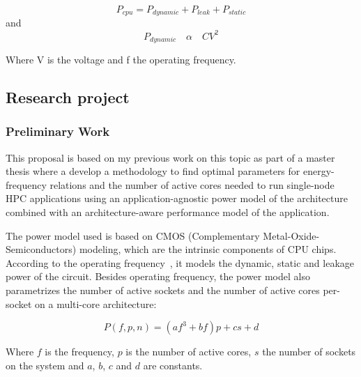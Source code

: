 \begin{equation}
    P_{cpu}=P_{dynamic}+P_{leak}+P_{static}
\end{equation}
and
\begin{equation}
    P_{dynamic} \quad \alpha \quad CV^2
\end{equation}

Where V is the voltage and f the operating frequency.

\subsection{Research project}

\subsubsection{Preliminary Work}

This proposal is based on my previous work on this topic as part of a master thesis where a develop a methodology to find optimal parameters for energy-frequency relations and the number of active cores needed to run single-node HPC applications using an application-agnostic power model of the architecture combined with an architecture-aware performance model of the application.

The power model used is based on CMOS (Complementary Metal-Oxide-Semiconductors) modeling, which are the intrinsic components of CPU chips. According to the operating frequency~\cite{Sarwar1997}, it models the dynamic, static and leakage power of the circuit. Besides operating frequency, the power model also parametrizes the number of active sockets and the number of active cores per-socket on a multi-core architecture:

\begin{equation}
    P(f,p,n)=(af^3+bf)p+cs+d
    \label{eq_power_final}
\end{equation}

Where $f$ is the frequency, $p$ is the number of active cores, $s$ the number of sockets on the system and $a$, $b$, $c$ and $d$ are constants.




